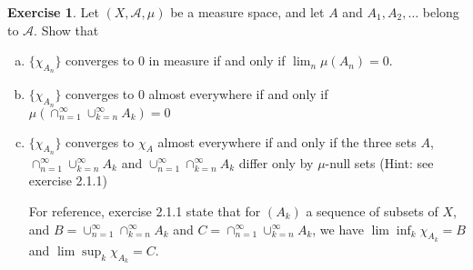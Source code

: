 \documentclass[11pt,a4paper,twoside]{article}
\theoremstyle{definition}
\newcounter{excounter}
\newtheorem{exercise}[excounter]{Exercise}
\begin{document}
\begin{exercise}
  Let $(X, \mathscr{A}, \mu)$ be a measure space, and let $A$ and $A_1, A_2, \ldots$ belong to $\mathscr{A}$. Show that
  \begin{enumerate}[(a)]
  \item
    $\{ \chi_{A_n} \}$ converges to 0 in measure if and only if $\lim_n \mu (A_n) = 0$.

  \item
    $\{ \chi_{A_n} \}$ converges to 0 almost everywhere if and only if $\mu (\cap_{n = 1}^\infty \cup_{k = n}^\infty A_k) = 0$

  \item
    $\{ \chi_{A_n} \}$ converges to $\chi_A$ almost everywhere if and only if the three sets $A$, $\cap_{n = 1}^\infty \cup_{k = n}^\infty A_k$ and $\cup_{n = 1}^\infty \cap_{k = n}^\infty A_k$
    differ only by $\mu$-null sets (Hint: see exercise 2.1.1)

    For reference, exercise 2.1.1 state that for $(A_k)$ a sequence of subsets of $X$, and $B = \cup_{n = 1}^\infty \cap_{k = n}^\infty A_k$ and $C = \cap_{n = 1}^\infty \cup_{k = n}^\infty A_k$,
    we have $\lim\inf_k \chi_{A_k} = B$ and $\lim\sup_k \chi_{A_k} = C$.
  \end{enumerate}
\end{exercise}
\end{document}
